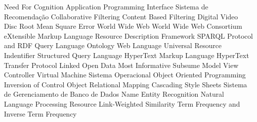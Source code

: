 \begin{acronym}[ACRONYM] 

 {Need For Cognition}
 {Application Programming Interface}
 {Sistema de Recomendação}
 {Collaborative Filtering}
 {Content Based Filtering}
 {Digital Video Disc}
 {Root Mean Square Error}
 {World Wide Web}
 {World Wide Web Consortium}
 {eXtensible Markup Language}
 {Resource Description Framework}
 {SPARQL Protocol and RDF Query Language}
 {Ontology Web Language}
 {Universal Resource Indentifier}
 {Structured Query Language}
 {HyperText Markup Language}
 {HyperText Transfer Protocol}
 {Linked Open Data}
 {Most Informative Subsume}
 {Model View Controller}
 {Virtual Machine}
 {Sistema Operacional}
 {Object Oriented Programming}
 {Inversion of Control}
 {Object Relational Mapping}
 {Cascading Style Sheets}
 {Sistema de Gerenciamento de Banco de Dados}
 {Name Entity Recognition}
 {Natural Language Processing}
 {Resource Link-Weighted Similarity}
 {Term Frequency and Inverse Term Frequency}
    
\end{acronym}